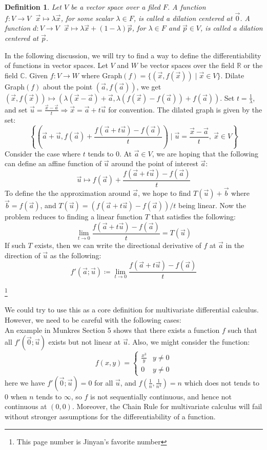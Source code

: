 \documentclass[15pt]{book}
\theoremstyle{break}
\theoremstyle{break}
\newtheorem{defn}{Definition}[corL]
\newcommand{\R}{\mathbb{R}}
\newcommand{\Complex}{\mathbb{C}}
\newcommand\blfootnote[1]{%
  \begingroup
  \renewcommand\thefootnote{}\footnote{#1}%
  \addtocounter{footnote}{-1}%
  \endgroup
}
\begin{document}
\begin{defn}
Let $V$ be a vector space over a filed $F$. A function $f:V \to V \ \ \ \vec{x}\mapsto \lambda \vec{x}$, for some scalar $\lambda \in F$, is called a dilation centered at $\vec{0}$. A function $d:V \to V \ \ \ \vec{x}\mapsto \lambda \vec{x} + (1-\lambda)\vec{p}$, for $\lambda \in F$ and $\vec{p}\in V$, is called a dilation centered at $\vec{p}$.\\
\end{defn}

In the following discussion, we will try to find a way to define the differentiability of functions in vector spaces. Let $V$ and $W$ be vector spaces over the field $\R$ or the field $\Complex$. Given $f:V \to W$ where Graph$(f) = \{ (\vec{x},f(\vec{x})) \mid \vec{x}\in V\}$. Dilate Graph$(f)$ about the point $(\vec{a},f(\vec{a}))$, we get $(\vec{x},f(\vec{x}))\mapsto (\lambda (\vec{x}-\vec{a})+\vec{a},\lambda (f(\vec{x})-f(\vec{a}))+f(\vec{a}))$. Set $t = \frac{1}{\lambda}$, and set $\vec{u} = \frac{\vec{x}-\vec{a}}{t} \Rightarrow \vec{x} = \vec{a}+t \vec{u}$ for convention. The dilated graph is given by the set: 
$$\left\{(\vec{a}+\vec{u},f(\vec{a})+\frac{f(\vec{a}+t\vec{u})-f(\vec{a})}{t})\mid \vec{u} = \frac{\vec{x}-\vec{a}}{t},\ \vec{x}\in V\right\}$$ 
Consider the case where $t$ tends to $0$. At $\vec{a}\in V$, we are hoping that the following can define an affine function of $\vec{u}$ around the point of interest $\vec{a}$:
$$\vec{u} \mapsto f(\vec{a})+\frac{f(\vec{a}+t\vec{u})-f(\vec{a})}{t}$$ 
To define the the approximation around $\vec{a}$, we hope to find $T(\vec{u})+\vec{b}$ where $\vec{b} = f(\vec{a})$, and $T(\vec{u}) = (f(\vec{a}+t\vec{u})-f(\vec{a}))/t$ being linear. Now the problem reduces to finding a linear function $T$ that satisfies the following:
$$\lim_{t\to 0} \frac{f(\vec{a}+t\vec{u})-f(\vec{a})}{t} = T(\vec{u})$$ If such $T$ exists, then we can write the directional derivative of $f$ at $\vec{a}$ in the direction of $\vec{u}$ as the following:
$$f'(\vec{a};\vec{u}) \coloneqq \lim_{t\to 0} \frac{f(\vec{a}+t\vec{u})-f(\vec{a})}{t}$$ 

\blfootnote{This page number is Jinyan's favorite number}
\newpage

We could try to use this as a core definition for multivariate differential calculus. However, we need to be careful with the following cases:\\

An example in Munkres Section 5 shows that there exists a function $f$ such that all $f'(\vec{0};\vec{u})$ exists but not linear at $\vec{u}$. Also, we might consider the function: $$f(x,y) = \begin{cases} \frac{x^3}{y} & y\neq 0 \\ 0 & y \neq 0\end{cases}$$ here we have $f'(\vec{0};\vec{u}) = 0$ for all $\vec{u}$, and $f(\frac{1}{n},\frac{1}{n^4}) = n$ which does not tends to $0$ when $n$ tends to $\infty$, so $f$ is not sequentially continuous, and hence not continuous at $(0,0)$. Moreover, the Chain Rule for multivariate calculus will fail without stronger assumptions for the differentiability of a function.\\
\end{document}
